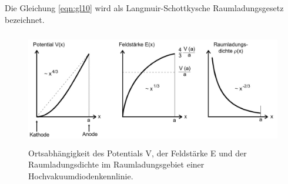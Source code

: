 Die Gleichung \eqref{eqn:gl10} wird als Langmuir-Schottkysche Raumladungsgesetz bezeichnet.
\begin{figure}
    \centering
    \includegraphics[height=5.0cm]{data/abb4.jpg}
    \caption{Ortsabhängigkeit des Potentials V, der Feldstärke E und der Raumladungsdichte \rho im Raumladungsgebiet einer Hochvakuumdiodenkennlinie. \cite{V504}}
    \label{fig:abb4}
\end{figure} \\
\noindent


